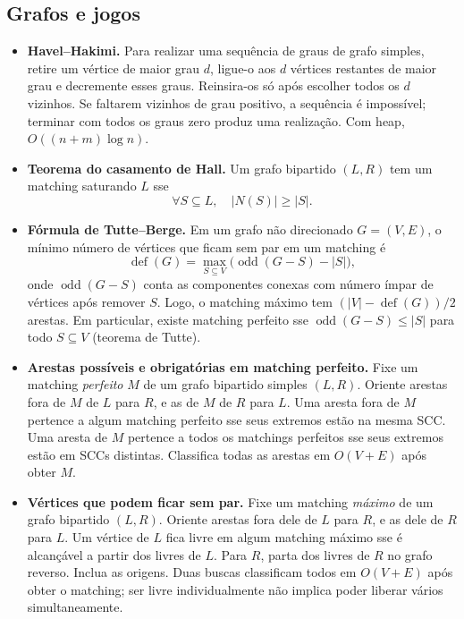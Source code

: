 \subsection{Grafos e jogos}
\begin{itemize}[leftmargin=*,label={}]
\item \textbf{Havel--Hakimi.}
Para realizar uma sequência de graus de grafo simples, retire um vértice de maior grau $d$, ligue-o aos $d$ vértices restantes de maior grau e decremente esses graus. Reinsira-os só após escolher todos os $d$ vizinhos. Se faltarem vizinhos de grau positivo, a sequência é impossível; terminar com todos os graus zero produz uma realização. Com heap, $O((n+m)\log n)$.

	\item \textbf{Teorema do casamento de Hall.}
		Um grafo bipartido $(L,R)$ tem um matching saturando $L$ sse
		\[
			\forall S \subseteq L,\quad |N(S)| \ge |S|.
		\]

	\ifextended
\item \textbf{Fórmula de Tutte--Berge.}
Em um grafo não direcionado $G=(V,E)$, o mínimo número de vértices que ficam sem par em um matching é
\[
\operatorname{def}(G)=\max_{S\subseteq V}
\bigl(\operatorname{odd}(G-S)-|S|\bigr),
\]
onde $\operatorname{odd}(G-S)$ conta as componentes conexas com número ímpar de vértices após remover $S$. Logo, o matching máximo tem $(|V|-\operatorname{def}(G))/2$ arestas. Em particular, existe matching perfeito sse $\operatorname{odd}(G-S)\le|S|$ para todo $S\subseteq V$ (teorema de Tutte).
\fi

\item \textbf{Arestas possíveis e obrigatórias em matching perfeito.}
Fixe um matching \emph{perfeito} $M$ de um grafo bipartido simples $(L,R)$. Oriente arestas fora de $M$ de $L$ para $R$, e as de $M$ de $R$ para $L$. Uma aresta fora de $M$ pertence a algum matching perfeito sse seus extremos estão na mesma SCC. Uma aresta de $M$ pertence a todos os matchings perfeitos sse seus extremos estão em SCCs distintas. Classifica todas as arestas em $O(V+E)$ após obter $M$.

\item \textbf{Vértices que podem ficar sem par.}
Fixe um matching \emph{máximo} de um grafo bipartido $(L,R)$. Oriente arestas fora dele de $L$ para $R$, e as dele de $R$ para $L$. Um vértice de $L$ fica livre em algum matching máximo sse é alcançável a partir dos livres de $L$. Para $R$, parta dos livres de $R$ no grafo reverso. Inclua as origens. Duas buscas classificam todos em $O(V+E)$ após obter o matching; ser livre individualmente não implica poder liberar vários simultaneamente.


\end{itemize}
